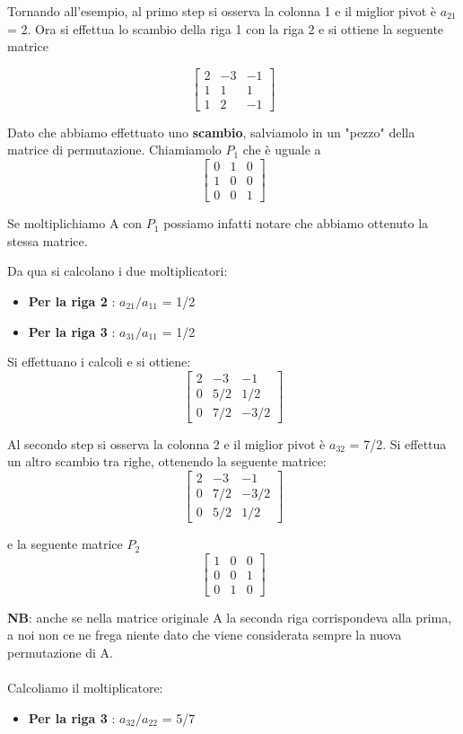 Tornando all'esempio, al primo step si osserva la colonna 1 e il miglior pivot è $a_{21}$ = 2.
Ora si effettua lo scambio della riga 1 con la riga 2 e si ottiene la seguente matrice

$$
\begin{bmatrix}
2 & -3 & -1 \\
1 & 1 & 1 \\
1 & 2 & -1 
\end{bmatrix}
$$

Dato che abbiamo effettuato uno \textbf{scambio}, salviamolo in un "pezzo" della matrice di permutazione. Chiamiamolo $P_1$ che è uguale a 
$$
\begin{bmatrix}
0 & 1 & 0 \\
1 & 0 & 0 \\
0 & 0 & 1 
\end{bmatrix}
$$

Se moltiplichiamo A con $P_1$ possiamo infatti notare che abbiamo ottenuto la stessa matrice.

Da qua si calcolano i due moltiplicatori:
\begin{itemize}
\item \textbf{Per la riga 2 }:  $a_{21}/a_{11}$ = 1/2
\item \textbf{Per la riga 3 }:  $a_{31}/a_{11}$ = 1/2
\end{itemize}

Si effettuano i calcoli e si ottiene:
$$
\begin{bmatrix}
2 & -3 & -1 \\
0 & 5/2 & 1/2 \\
0 & 7/2 & -3/2 
\end{bmatrix}
$$

Al secondo step si osserva la colonna 2 e il miglior pivot è $a_{32}$ = 7/2. Si effettua un altro scambio tra righe, ottenendo la seguente matrice:
$$
\begin{bmatrix}
2 & -3 & -1 \\
0 & 7/2 & -3/2 \\
0 & 5/2 & 1/2 
\end{bmatrix}
$$

e la seguente matrice $P_2$
$$
\begin{bmatrix}
1 & 0 & 0 \\
0 & 0 & 1 \\
0 & 1 & 0 
\end{bmatrix}
$$

\textbf{NB}: anche se nella matrice originale A la seconda riga corrispondeva alla prima, a noi non ce ne frega niente dato che viene considerata sempre la nuova permutazione di A.
\\ \\
Calcoliamo il moltiplicatore:
\begin{itemize}
\item \textbf{Per la riga 3 }:  $a_{32}/a_{22}$ = 5/7
\end{itemize}

